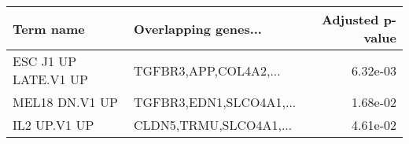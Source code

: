 \begin{tabular}{llr}
\toprule
           Term name &    Overlapping genes... &  Adjusted p-value \\
\midrule
ESC J1 UP LATE.V1 UP &   TGFBR3,APP,COL4A2,... &          6.32e-03 \\
      MEL18 DN.V1 UP & TGFBR3,EDN1,SLCO4A1,... &          1.68e-02 \\
        IL2 UP.V1 UP &  CLDN5,TRMU,SLCO4A1,... &          4.61e-02 \\
\bottomrule
\end{tabular}
